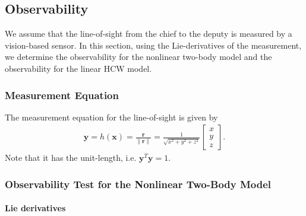 \documentclass[10pt]{article}
\newcommand{\refeqn}[1]{(\ref{eqn:#1})}
\renewcommand{\r}{\mathbf{r}}
\newcommand{\y}{\mathbf{y}}
\begin{document}
%
%
%
\subsection{Observability}

We assume that the line-of-sight from the chief to the deputy is measured by a vision-based sensor. In this section, using the Lie-derivatives of the measurement, we determine the observability for the nonlinear two-body model and the observability for the linear HCW model.

\subsubsection{Measurement Equation}

The measurement equation for the line-of-sight is given by
\begin{align}
\mathbf{y}= h(\mathbf{x}) =\frac{\r}{\|\r\|}
= \frac{1}{\sqrt{x^2+y^2+z^2}}\begin{bmatrix} x\\y\\z\end{bmatrix}.
\end{align}
Note that it has the unit-length, i.e. $\y^T\y=1$.

\subsubsection{Observability Test for the Nonlinear Two-Body Model}\label{sec:OT}

\paragraph{Lie derivatives}
\end{document}

